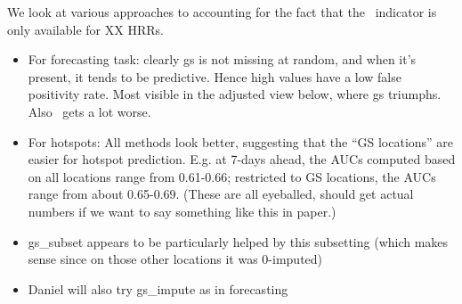 
We look at various approaches to
accounting for the fact that the \gs~indicator is only available
for XX HRRs.

\begin{itemize}
  \item For forecasting task: clearly gs is not missing at random, and when it's present, it tends to be predictive.  Hence high values have a low false positivity rate.  Most visible in the adjusted view below, where gs triumphs.  Also \chngcli~gets a lot worse.

\item For hotspots: All methods look better, suggesting that the “GS locations” are easier for hotspot prediction. E.g. at 7-days ahead, the AUCs computed based on all locations range from 0.61-0.66; restricted to GS locations, the AUCs range from about 0.65-0.69. (These are all eyeballed, should get actual numbers if we want to say something like this in paper.)
\item gs\_subset appears to be particularly helped by this subsetting
  (which makes sense since on those other locations it was 0-imputed)
  \item Daniel will also try gs\_impute as in forecasting
\end{itemize}




